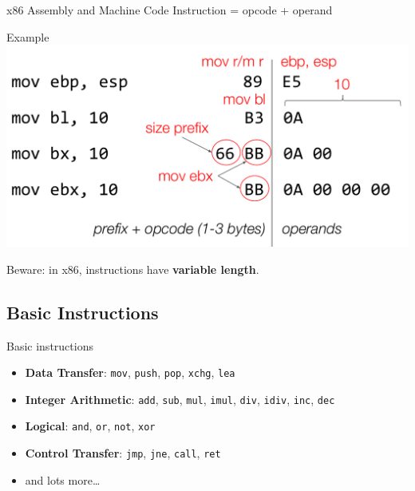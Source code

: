 \documentclass[]{beamer}
\begin{document}
\begin{frame}{x86 Assembly and Machine Code}
Instruction = opcode + operand

\begin{block}{Example}
	\centering
    	\includegraphics[width=.95\linewidth]{images/asm-machine-map}
\end{block}

Beware: in x86, instructions have \textbf{variable length}.
\end{frame}

\subsection{Basic Instructions}


\begin{frame}{Basic instructions}
	\begin{itemize}
	  \item \textbf{Data Transfer}: {\tt mov}, {\tt push}, {\tt pop}, {\tt xchg}, {\tt lea}
	  \item \textbf{Integer Arithmetic}: {\tt add}, {\tt sub}, {\tt mul}, {\tt imul}, {\tt div}, {\tt idiv}, {\tt inc}, {\tt dec}
	  \item \textbf{Logical}: {\tt and}, {\tt or}, {\tt not}, {\tt xor}
	  \item \textbf{Control Transfer}: {\tt jmp}, {\tt jne}, {\tt call}, {\tt ret}
	  \item and lots more\dots
	\end{itemize}
\end{frame}
\end{document}
